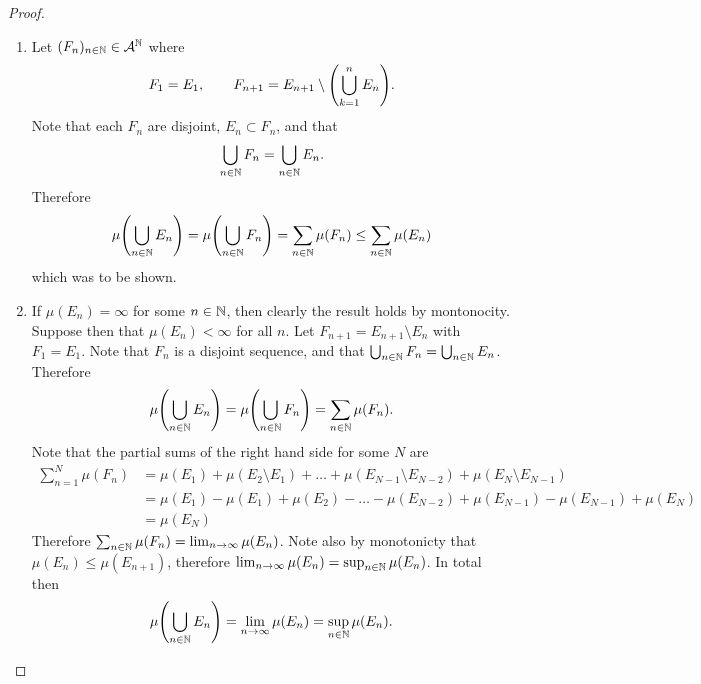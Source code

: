 \documentclass[hw_all.tex]{subfiles}
\begin{document}
\begin{proof}
    \begin{enumerate}
        \item 
            Let $(F_n)_{n \in \mathbb{N}} \in \mathcal{A}^{\mathbb{N}}$ where
            \[
                F_1 = E_1, \qquad F_{n+1} = E_{n+1} \setminus \qty(\bigcup_{k=1}^n E_n)
            .\]
            Note that each $F_n$ are disjoint, $E_n \subset F_n$, and that
            \[
                \bigcup_{n \in \mathbb{N}} F_n = \bigcup_{n \in \mathbb{N}} E_n
            .\]
            Therefore
            \[
                \mu\qty(\bigcup_{n \in \mathbb{N}} E_n) = \mu\qty(\bigcup_{n \in \mathbb{N}} F_n) = \sum_{n \in \mathbb{N}} \mu(F_n) \leq \sum_{n \in \mathbb{N}} \mu(E_n)
            \]
            which was to be shown.

        \item 
            If $\mu(E_n) = \infty$ for some $n \in \mathbb{N}$, then clearly the result holds by montonocity. Suppose then that $\mu(E_n) < \infty$ for all $n$. Let $F_{n+1} = E_{n+1} \setminus E_n$ with $F_1 = E_1$. Note that $F_n$ is a disjoint sequence, and that $\bigcup_{n \in \mathbb{N}} F_n = \bigcup_{n \in \mathbb{N}} E_n$. Therefore
            \[
                \mu\qty(\bigcup_{n \in \mathbb{N}} E_n) = \mu\qty(\bigcup_{n \in \mathbb{N}} F_n) = \sum_{n \in \mathbb{N}} \mu(F_n)
            .\]
            Note that the partial sums of the right hand side for some $N$ are
            \begin{align*}
                \sum_{n=1}^N \mu(F_n) &= \mu(E_1) + \mu(E_2 \setminus E_1) + \ldots + \mu(E_{N-1} \setminus E_{N-2}) + \mu(E_N \setminus E_{N-1}) \\
                &= \mu(E_1) - \mu(E_1) + \mu(E_2) - \ldots - \mu(E_{N - 2}) + \mu(E_{N-1}) - \mu(E_{N-1}) + \mu(E_{N}) \\
                &= \mu(E_{N})
            \end{align*}
            Therefore $\sum_{n \in \mathbb{N}} \mu(F_n) = \lim_{n \to \infty} \mu(E_n)$. Note also by monotonicty that $\mu(E_n) \leq \mu(E_{n+1})$, therefore $\lim_{n\to \infty} \mu(E_n) = \sup_{n \in \mathbb{N}} \mu(E_n)$. In total then
            \[
                \mu\qty(\bigcup_{n \in \mathbb{N}} E_n) = \lim_{n \to \infty} \mu(E_n) = \sup_{n \in \mathbb{N}} \mu(E_n)
            .\]


\end{enumerate}
\end{proof}
\end{document}
